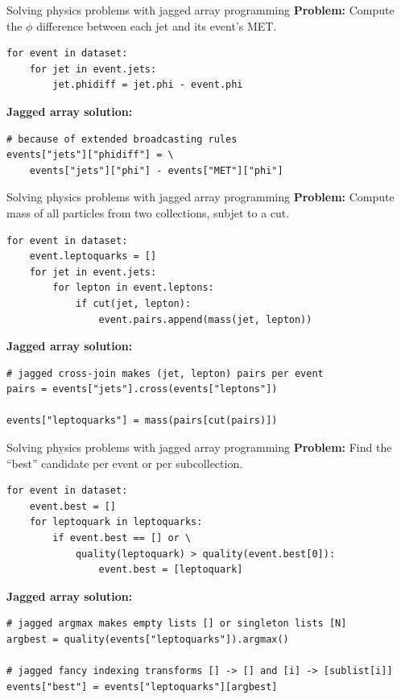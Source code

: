 \documentclass[aspectratio=169]{beamer}
\begin{document}
\begin{frame}[fragile]{Solving physics problems with jagged array programming}
\vspace{0.5 cm}
{\bf Problem:} Compute the $\phi$ difference between each jet and its event's MET.
\small
\begin{verbatim}
for event in dataset:
    for jet in event.jets:
        jet.phidiff = jet.phi - event.phi
\end{verbatim}
\normalsize

\vspace{0.5 cm}
{\bf Jagged array solution:} 
\small
\begin{verbatim}
# because of extended broadcasting rules
events["jets"]["phidiff"] = \
    events["jets"]["phi"] - events["MET"]["phi"]
\end{verbatim}
\end{frame}

\begin{frame}[fragile]{Solving physics problems with jagged array programming}
\vspace{0.5 cm}
{\bf Problem:} Compute mass of all particles from two collections, subjet to a cut.
\small
\begin{verbatim}
for event in dataset:
    event.leptoquarks = []
    for jet in event.jets:
        for lepton in event.leptons:
            if cut(jet, lepton):
                event.pairs.append(mass(jet, lepton))
\end{verbatim}
\normalsize

\vspace{0.5 cm}
{\bf Jagged array solution:} 
\small
\begin{verbatim}
# jagged cross-join makes (jet, lepton) pairs per event
pairs = events["jets"].cross(events["leptons"])

events["leptoquarks"] = mass(pairs[cut(pairs)])
\end{verbatim}
\end{frame}

\begin{frame}[fragile]{Solving physics problems with jagged array programming}
\vspace{0.5 cm}
{\bf Problem:} Find the ``best'' candidate per event or per subcollection.
\small
\begin{verbatim}
for event in dataset:
    event.best = []
    for leptoquark in leptoquarks:
        if event.best == [] or \
            quality(leptoquark) > quality(event.best[0]):
                event.best = [leptoquark]
\end{verbatim}
\normalsize

\vspace{0.5 cm}
{\bf Jagged array solution:} 
\small
\begin{verbatim}
# jagged argmax makes empty lists [] or singleton lists [N]
argbest = quality(events["leptoquarks"]).argmax()

# jagged fancy indexing transforms [] -> [] and [i] -> [sublist[i]]
events["best"] = events["leptoquarks"][argbest]
\end{verbatim}
\end{frame}
\end{document}
